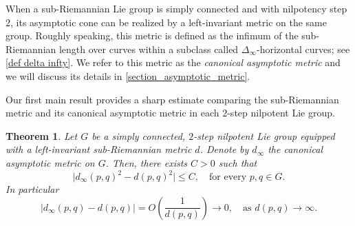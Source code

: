\documentclass[a4paper,11pt,reqno]{amsart}
\theoremstyle{plain}
\newtheorem{theorem}{Theorem}[section]
\theoremstyle{definition}
\begin{document}
 When a sub-Riemannian Lie group is simply connected and with nilpotency step $2$, its asymptotic cone can be realized by a left-invariant metric on the same group. Roughly speaking, this metric is defined as the infimum of the sub-Riemannian length over curves within a subclass called $\Delta_\infty$-horizontal curves; see \eqref{def delta infty}. We refer to this metric as the \emph{canonical asymptotic metric} and we will discuss its details in \cref{section_asymptotic_metric}.

Our first main result provides a sharp estimate comparing the sub-Riemannian metric and its canonical asymptotic metric in each $2$-step nilpotent Lie group.

\begin{theorem} \label{main theorem}
Let $G$ be a simply connected, $2$-step nilpotent Lie group equipped with a left-invariant sub-Riemannian metric $d$. Denote by $d_\infty$ the canonical asymptotic metric on $G$. Then, there exists $C > 0$ such that
\begin{equation} \label{main equation}
\lvert d_\infty(p,q)^2 - d(p,q)^2 \rvert \leq C, \quad \text{for every } p,q \in G.
\end{equation}
In particular
\begin{equation} \label{first consequence}
 \lvert d_\infty(p,q) - d(p,q) \rvert = O\left(\frac{1}{d(p,q)}\right) \to 0, \quad \text{as $d(p,q) \to \infty$.}
\end{equation}
\end{theorem}
\end{document}
